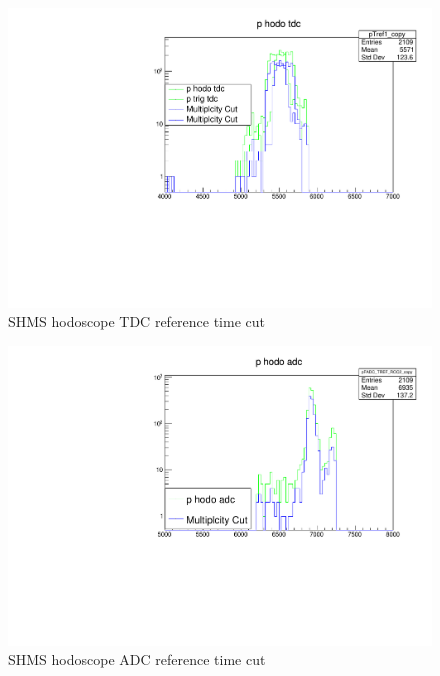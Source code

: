 \documentclass[10pt]{beamer}
\begin{document}
\begin{frame}{}
    \begin{figure}
    \centering
    \includegraphics[width=\textwidth]{p_hodo_tdc.pdf}
    \caption{SHMS hodoscope TDC reference time cut}
\end{figure}{}
\end{frame}{}

\begin{frame}{}
    \begin{figure}
    \centering
    \includegraphics[width=\textwidth]{p_hodo_adc.pdf}
    \caption{SHMS hodoscope ADC reference time cut}
\end{figure}{}
\end{frame}{}
\end{document}
